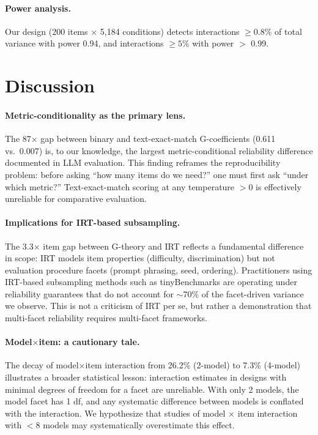 \documentclass[letterpaper]{article}
\begin{document}
\paragraph{Power analysis.}
Our design (200 items $\times$ 5,184 conditions) detects interactions $\geq 0.8\%$ of total variance with power 0.94, and interactions $\geq 5\%$ with power $>$ 0.99.

\section{Discussion}

\paragraph{Metric-conditionality as the primary lens.}
The 87$\times$ gap between binary and text-exact-match G-coefficients (0.611 vs.\ 0.007) is, to our knowledge, the largest metric-conditional reliability difference documented in LLM evaluation. This finding reframes the reproducibility problem: before asking ``how many items do we need?'' one must first ask ``under which metric?'' Text-exact-match scoring at any temperature $> 0$ is effectively unreliable for comparative evaluation.

\paragraph{Implications for IRT-based subsampling.}
The 3.3$\times$ item gap between G-theory and IRT reflects a fundamental difference in scope: IRT models item properties (difficulty, discrimination) but not evaluation procedure facets (prompt phrasing, seed, ordering). Practitioners using IRT-based subsampling methods such as tinyBenchmarks \citep{polo2024tinybenchmarks} are operating under reliability guarantees that do not account for $\sim$70\% of the facet-driven variance we observe. This is not a criticism of IRT per se, but rather a demonstration that multi-facet reliability requires multi-facet frameworks.

\paragraph{Model$\times$item: a cautionary tale.}
The decay of model$\times$item interaction from 26.2\% (2-model) to 7.3\% (4-model) illustrates a broader statistical lesson: interaction estimates in designs with minimal degrees of freedom for a facet are unreliable. With only 2 models, the model facet has 1 df, and any systematic difference between models is conflated with the interaction. We hypothesize that studies of model $\times$ item interaction with $< 8$ models may systematically overestimate this effect.
\end{document}
